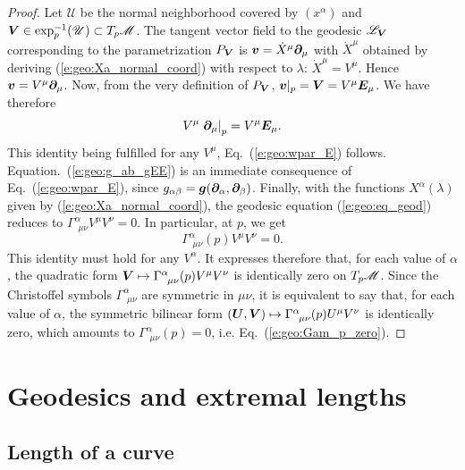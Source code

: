 \begin{proof}
Let $\mathscr{U}$ be the normal neighborhood covered by $(x^\alpha)$ and
$\bm{V}\in \exp_p^{-1}(\mathscr{U})\subset T_p\mathscr{M}$.
The tangent vector field to the geodesic $\mathscr{L}_{\bm{V}}$ corresponding
to the parametrization $P_{\bm{V}}$ is $\bm{v} = \dot{X}^\mu \bm{\partial}_\mu$
with $\dot{X}^\mu$ obtained by deriving (\ref{e:geo:Xa_normal_coord})
with respect to $\lambda$:
$\dot{X}^\mu = V^\mu$. Hence $\bm{v} = V^\mu \bm{\partial}_\mu$. Now, from
the very definition of $P_{\bm{V}}$, $\bm{v}|_p = \bm{V} = V^\mu \bm{E}_\mu$.
We have therefore
\[
    V^\mu \left. \bm{\partial}_\mu \right|_p = V^\mu \bm{E}_\mu .
\]
This identity being fulfilled for any $V^\mu$, Eq.~(\ref{e:geo:wpar_E})
follows. Equation.~(\ref{e:geo:g_ab_gEE}) is an immediate consequence
of Eq.~(\ref{e:geo:wpar_E}),
since $g_{\alpha\beta} = \bm{g}(\bm{\partial}_\alpha, \bm{\partial}_\beta)$.
Finally, with the functions $X^\alpha(\lambda)$ given by
(\ref{e:geo:Xa_normal_coord}), the geodesic equation (\ref{e:geo:eq_geod})
reduces to $\Gamma^\alpha_{\ \, \mu \nu} V^\mu V^\nu = 0$. In particular, at
$p$, we get
\[
  \Gamma^\alpha_{\ \, \mu \nu}(p) V^\mu V^\nu = 0 .
\]
This identity must hold for any $V^\alpha$. It expresses therefore that, for
each value of $\alpha$,
the quadratic form $\bm{V} \mapsto \Gamma^\alpha_{\ \, \mu \nu}(p) V^\mu V^\nu$
is identically zero on $T_p\mathscr{M}$. Since the Christoffel symbols $\Gamma^\alpha_{\ \, \mu \nu}$
are symmetric in $\mu\nu$, it is equivalent to say that, for each value of
$\alpha$, the symmetric bilinear form $(\bm{U},\bm{V})\mapsto \Gamma^\alpha_{\ \, \mu \nu}(p)
U^\mu V^\nu$ is identically zero, which amounts to $\Gamma^\alpha_{\ \, \mu \nu}(p) =0$, i.e.
Eq.~(\ref{e:geo:Gam_p_zero}).
\end{proof}


\section{Geodesics and extremal lengths}

\subsection{Length of a curve} \label{s:geo:length}

